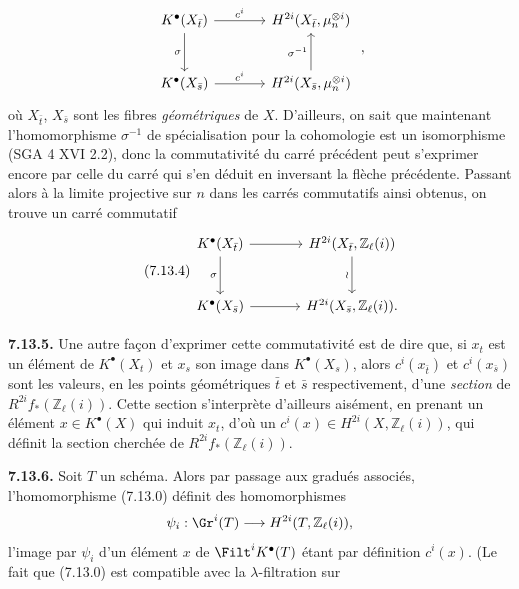 
\[
\begin{tikzcd}[column sep=large,row sep=large]
K^\bullet(X_{\bar t}) \arrow[r,"c^i"] \arrow[d,"\sigma"'] &
H^{2i}(X_{\bar t},\mu_n^{\otimes i})\\
K^\bullet(X_{\bar s}) \arrow[r,"c^i"] &
H^{2i}(X_{\bar s},\mu_n^{\otimes i}) \arrow[u,"\sigma^{-1}"]
\end{tikzcd}
\;,
\]
où \(X_{\bar t}\), \(X_{\bar s}\)
sont les fibres \emph{géométriques} de \(X\). D'ailleurs, on sait que maintenant l'homomorphisme \(\sigma^{-1}\) de spécialisation pour la cohomologie est un isomorphisme (SGA 4 XVI 2.2), donc la commutativité du carré précédent peut s'exprimer encore par celle du carré qui s'en déduit en inversant la flèche précédente. Passant alors à la limite projective sur \(n\) dans les carrés commutatifs ainsi obtenus, on trouve un carré commutatif
\begin{equation}\tag{7.13.4}
\begin{tikzcd}[column sep=large,row sep=large]
K^\bullet(X_{\bar t}) \arrow[r] \arrow[d,"\sigma"'] &
H^{2i}(X_{\bar t},\mathbb Z_\ell(i)) \arrow[d,"\wr"']\\
K^\bullet(X_{\bar s}) \arrow[r] &
H^{2i}(X_{\bar s},\mathbb Z_\ell(i)).
\end{tikzcd}
\end{equation}

\textbf{7.13.5.} Une autre façon d'exprimer cette commutativité est de dire que, si \(x_t\) est un élément de \(K^\bullet(X_t)\) et \(x_s\) son image dans \(K^\bullet(X_s)\), alors \(c^i(x_{\bar t})\) et \(c^i(x_{\bar s})\) sont les valeurs, en les points géométriques \(\bar t\) et \(\bar s\) respectivement, d'une \emph{section} de \(R^{2i}f_*(\mathbb Z_\ell(i))\). Cette section s'interprète d'ailleurs aisément, en prenant un élément \(x\in K^\bullet(X)\) qui induit \(x_t\), d'où un \(c^i(x)\in H^{2i}(X,\mathbb Z_\ell(i))\), qui définit la section cherchée de \(R^{2i}f_*(\mathbb Z_\ell(i))\).

\textbf{7.13.6.} Soit \(T\) un schéma. Alors par passage aux gradués associés, l'homomorphisme (7.13.0) définit des homomorphismes
\[
  \psi_i:\Gr^i(T)\longrightarrow H^{2i}(T,\mathbb Z_\ell(i)),
\]
l'image par \(\psi_i\) d'un élément \(x\) de \(\Filt^iK^\bullet(T)\) étant par définition \(c^i(x)\). (Le fait que (7.13.0) est compatible avec la \(\lambda\)-filtration sur 
